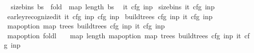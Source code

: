 \begin{isabellebody}
\ \ {\isachardoublequoteopen}size{\isacharunderscore}{\kern0pt}bins\ bs\ {\isacharequal}{\kern0pt}\ fold\ {\isacharparenleft}{\kern0pt}{\isacharplus}{\kern0pt}{\isacharparenright}{\kern0pt}\ {\isacharparenleft}{\kern0pt}map\ length\ bs{\isacharparenright}{\kern0pt}\ {}{\isachardoublequoteclose}\isanewline
\isanewline
{}\isamarkupfalse%
\ {\isachardoublequoteopen}{\isasymII}{\isacharunderscore}{\kern0pt}it\ cfg{}\ inp{}{\isachardoublequoteclose}\isanewline
{}\isamarkupfalse%
\ {\isachardoublequoteopen}size{\isacharunderscore}{\kern0pt}bins\ {\isacharparenleft}{\kern0pt}{\isasymII}{\isacharunderscore}{\kern0pt}it\ cfg{}\ inp{}{\isacharparenright}{\kern0pt}{\isachardoublequoteclose}\isanewline
{}\isamarkupfalse%
\ {\isachardoublequoteopen}earley{\isacharunderscore}{\kern0pt}recognized{\isacharunderscore}{\kern0pt}it\ {\isacharparenleft}{\kern0pt}{\isasymII}{\isacharunderscore}{\kern0pt}it\ cfg{}\ inp{}{\isacharparenright}{\kern0pt}\ cfg{}\ inp{}{\isachardoublequoteclose}\isanewline
{}\isamarkupfalse%
\ {\isachardoublequoteopen}build{\isacharunderscore}{\kern0pt}trees\ cfg{}\ inp{}\ {\isacharparenleft}{\kern0pt}{\isasymII}{\isacharunderscore}{\kern0pt}it\ cfg{}\ inp{}{\isacharparenright}{\kern0pt}{\isachardoublequoteclose}\isanewline
{}\isamarkupfalse%
\ {\isachardoublequoteopen}map{\isacharunderscore}{\kern0pt}option\ {\isacharparenleft}{\kern0pt}map\ trees{\isacharparenright}{\kern0pt}\ {\isacharparenleft}{\kern0pt}build{\isacharunderscore}{\kern0pt}trees\ cfg{}\ inp{}\ {\isacharparenleft}{\kern0pt}{\isasymII}{\isacharunderscore}{\kern0pt}it\ cfg{}\ inp{}{\isacharparenright}{\kern0pt}{\isacharparenright}{\kern0pt}{\isachardoublequoteclose}\isanewline
{}\isamarkupfalse%
\ {\isachardoublequoteopen}map{\isacharunderscore}{\kern0pt}option\ {\isacharparenleft}{\kern0pt}foldl\ {\isacharparenleft}{\kern0pt}{\isacharplus}{\kern0pt}{\isacharparenright}{\kern0pt}\ {}\ {\isasymcirc}\ map\ length{\isacharparenright}{\kern0pt}\ {\isacharparenleft}{\kern0pt}map{\isacharunderscore}{\kern0pt}option\ {\isacharparenleft}{\kern0pt}map\ trees{\isacharparenright}{\kern0pt}\ {\isacharparenleft}{\kern0pt}build{\isacharunderscore}{\kern0pt}trees\ cfg{}\ inp{}\ {\isacharparenleft}{\kern0pt}{\isasymII}{\isacharunderscore}{\kern0pt}it\ cfg{}\ inp{}{\isacharparenright}{\kern0pt}{\isacharparenright}{\kern0pt}{\isacharparenright}{\kern0pt}{\isachardoublequoteclose}%

\end{isabellebody}

